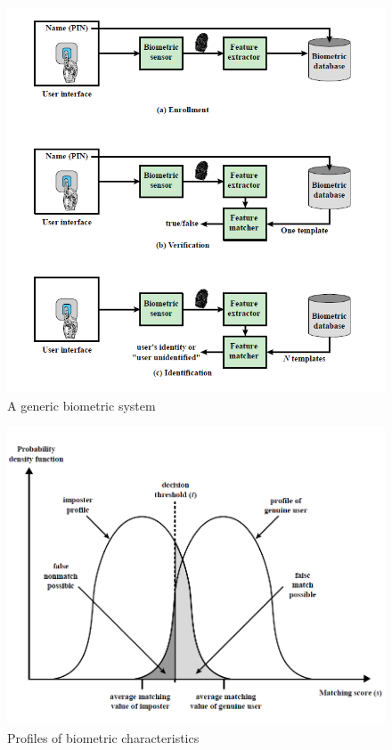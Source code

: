 \documentclass{article}
\begin{document}
                 \begin{figure}[h]
                    \begin{center}
                        \includegraphics[scale=0.5]{../immagini/Biometric_system.png}
                    \end{center}
                    \caption{A generic
                    biometric
                    system}
                \end{figure}
                \begin{figure}[h]
                    \begin{center}
                        \includegraphics[scale=0.5]{../immagini/Density.png}
                    \end{center}
                    \caption{Profiles of
                    biometric
                    characteristics}
                \end{figure}
\end{document}
